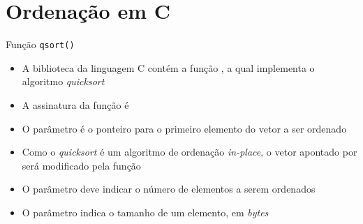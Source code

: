 \section{Ordenação em C}

\begin{frame}[fragile]{Função \texttt{qsort()}}

    \begin{itemize}
        \item A biblioteca  da linguagem C contém a função 
            , a qual implementa o algoritmo \textit{quicksort}

        \item A assinatura da função  é

        \item O parâmetro  é o ponteiro para o primeiro elemento do vetor a 
            ser ordenado

        \item Como o \textit{quicksort} é um algoritmo de ordenação \textit{in-place}, o vetor
            apontado por  será modificado pela função 

        \item O parâmetro  deve indicar o número de elementos a serem ordenados

        \item O parâmetro  indica o tamanho de um elemento, em \textit{bytes}
    \end{itemize}

\end{frame}

